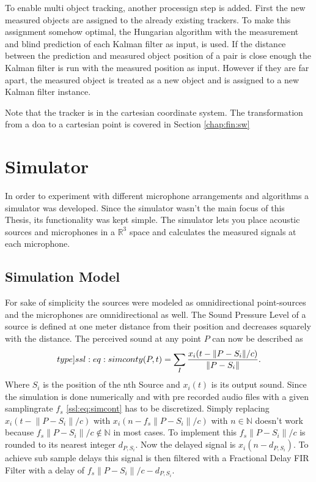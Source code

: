 To enable multi object tracking, another processign step is added.
First the new measured objects are assigned to the already
existing trackers. 
To make this assignment somehow optimal, the Hungarian algorithm 
with the measurement and blind prediction of each Kalman filter as input, is used.
If the distance between the prediction and measured object position of a pair is close enough
the Kalman filter is run with the measured position as input.
However if they are far apart, the measured object is treated as a new object
and is assigned to a new Kalman filter instance.

Note that the tracker is in the cartesian coordinate system.
The transformation from a \acrshort*{doa} to a cartesian point is
covered in Section \ref*{chap:fin:sw}

\newpage
\section{Simulator}
In order to experiment with different microphone arrangements and algorithms a simulator was developed.
Since the simulator wasn't the main focus of this Thesis, its functionality was kept simple.
The simulator lets you place acoustic sources and microphones in a $\mathbb{R}^3$ space and calculates
the measured signals at each microphone.

\subsection{Simulation Model}
For sake of simplicity the sources were modeled as omnidirectional point-sources and the
microphones are omnidirectional as well.
The Sound Pressure Level of a source is defined at one meter distance from their position and decreases
squarely with the distance.
The perceived sound at any point $P$ can now be described as
\begin{equation}
	\label[type]{ssl:eq:simcont}
	y(P, t) = \sum_{I} \frac{x_i(t - \lVert P - S_i\rVert/c)}{\lVert P - S_i\rVert}.
\end{equation}
Where $S_i$ is the position of the nth Source and $x_i(t)$ is its output sound.
Since the simulation is done numerically and with pre recorded audio files with a given
samplingrate $f_s$ \eqref{ssl:eq:simcont} has to be discretized.
Simply replacing $x_i(t - \lVert P - S_i\rVert/c)$ with
$x_i(n - f_s \lVert P - S_i\rVert/c)$ with
$n \in \mathbb{N}$ doesn't work because
$f_s \lVert P - S_i\rVert/c \not \in \mathbb{N}$ in most cases.
To implement this $f_s \lVert P - S_i\rVert/c$ is rounded to
its nearest integer $d_{P,S_i}$.
Now the delayed signal is $x_i(n - d_{P,S_i})$.
To achieve sub sample delays this signal is then filtered
with a Fractional Delay FIR Filter with a delay of
$f_s \lVert P - S_i\rVert/c - d_{P,S_i}$.

